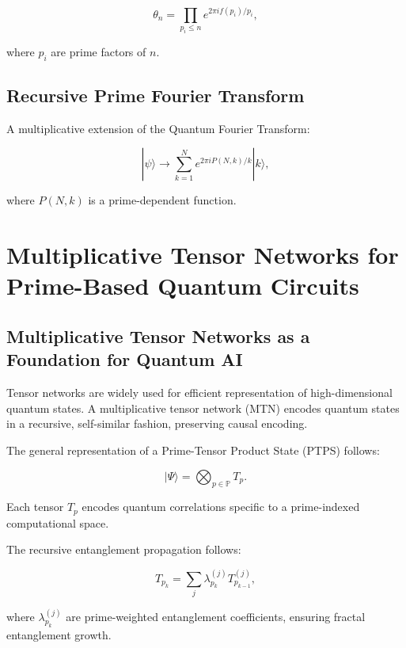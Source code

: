 \documentclass{article}
\theoremstyle{plain}
\begin{document}
\begin{itemize}
\begin{itemize}
\begin{equation}
\theta_n = \prod_{p_i \leq n} e^{2\pi i f(p_i) / p_i},
\end{equation}

where \( p_i \) are prime factors of \( n \).

\subsection{Recursive Prime Fourier Transform}
A multiplicative extension of the Quantum Fourier Transform:

\begin{equation}
|\psi\rangle \to \sum_{k=1}^{N} e^{2\pi i P(N,k) / k} |k\rangle,
\end{equation}

where \( P(N,k) \) is a prime-dependent function.

\section{Multiplicative Tensor Networks for Prime-Based Quantum Circuits}

\subsection{Multiplicative Tensor Networks as a Foundation for Quantum AI}

Tensor networks are widely used for efficient representation of high-dimensional quantum states. A multiplicative tensor network (MTN) encodes quantum states in a recursive, self-similar fashion, preserving causal encoding.

The general representation of a Prime-Tensor Product State (PTPS) follows:

\begin{equation}
|\Psi\rangle = \bigotimes_{p \in \mathbb{P}} T_p.
\end{equation}

Each tensor \( T_p \) encodes quantum correlations specific to a prime-indexed computational space.

The recursive entanglement propagation follows:

\begin{equation}
T_{p_k} = \sum_{j} \lambda_{p_k}^{(j)} T_{p_{k-1}}^{(j)},
\end{equation}

where \( \lambda_{p_k}^{(j)} \) are prime-weighted entanglement coefficients, ensuring fractal entanglement growth.



\end{itemize}
\end{itemize}
\end{document}
